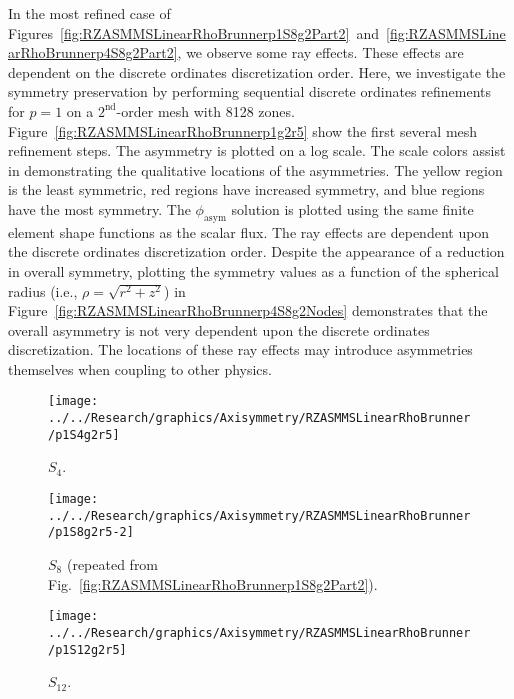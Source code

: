 \documentclass[12pt,letterpaper]{article}
\begin{document}
\FloatBarrier

In the most refined case of Figures~\ref{fig:RZASMMSLinearRhoBrunnerp1S8g2Part2}~and~\ref{fig:RZASMMSLinearRhoBrunnerp4S8g2Part2}, we observe some ray effects. These effects are dependent on the discrete ordinates discretization order. Here, we investigate the symmetry preservation by performing sequential discrete ordinates refinements for $p=1$ on a $2^\text{nd}$-order mesh with 8128 zones. Figure~\ref{fig:RZASMMSLinearRhoBrunnerp1g2r5} show the first several mesh refinement steps. The asymmetry is plotted on a log scale. The scale colors assist in demonstrating the qualitative locations of the asymmetries. The yellow region is the least symmetric, red regions have increased symmetry, and blue regions have the most symmetry. The $\phi_\text{asym}$ solution is plotted using the same finite element shape functions as the scalar flux. The ray effects are dependent upon the discrete ordinates discretization order. Despite the appearance of a reduction in overall symmetry, plotting the symmetry values as a function of the spherical radius (i.e., $\rho=\sqrt{r^2+z^2}$) in Figure~\ref{fig:RZASMMSLinearRhoBrunnerp4S8g2Nodes} demonstrates that the overall asymmetry is not very dependent upon the discrete ordinates discretization. The locations of these ray effects may introduce asymmetries themselves when coupling to other physics.

\begin{sidewaysfigure}[!htb]
\centering
\begin{subfigure}{0.33\textwidth}
\texttt{[image: ../../Research/graphics/Axisymmetry/RZASMMSLinearRhoBrunner/p1S4g2r5]}
\caption{$S_4$.}
\end{subfigure}%
\begin{subfigure}{0.33\textwidth}
\texttt{[image: ../../Research/graphics/Axisymmetry/RZASMMSLinearRhoBrunner/p1S8g2r5-2]}
\caption{$S_8$ (repeated from Fig.~\ref{fig:RZASMMSLinearRhoBrunnerp1S8g2Part2}).}
\end{subfigure}%
\begin{subfigure}{0.33\textwidth}
\texttt{[image: ../../Research/graphics/Axisymmetry/RZASMMSLinearRhoBrunner/p1S12g2r5]}
\caption{$S_{12}$.}
\end{subfigure}
\caption{Relative asymmetry for $p=1$ finite elements on a $2^\text{nd}$-order mesh with 8128 zones; mesh overlay may be removed for clarity.}
\label{fig:RZASMMSLinearRhoBrunnerp1g2r5}
\end{sidewaysfigure}
\end{document}
